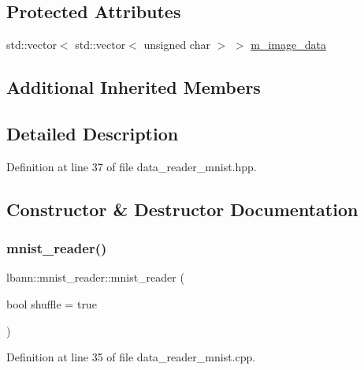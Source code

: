 \subsection*{Protected Attributes}
\begin{DoxyCompactItemize}
\item 
std\+::vector$<$ std\+::vector$<$ unsigned char $>$ $>$ \hyperlink{classlbann_1_1mnist__reader_a566ec18b29037abafe472b371f86aaca}{m\+\_\+image\+\_\+data}
\end{DoxyCompactItemize}
\subsection*{Additional Inherited Members}


\subsection{Detailed Description}


Definition at line 37 of file data\+\_\+reader\+\_\+mnist.\+hpp.



\subsection{Constructor \& Destructor Documentation}
\mbox{\label{classlbann_1_1mnist__reader_abe2c3dd2e8d5ad42ec762fdd37bc9769}} 
\subsubsection{\texorpdfstring{mnist\+\_\+reader()}{mnist\_reader()}\hspace{0.1cm}{\footnotesize\ttfamily [1/3]}}
{\footnotesize\ttfamily lbann\+::mnist\+\_\+reader\+::mnist\+\_\+reader (\begin{DoxyParamCaption}\item[{bool}]{shuffle = {\ttfamily true} }\end{DoxyParamCaption})}



Definition at line 35 of file data\+\_\+reader\+\_\+mnist.\+cpp.



